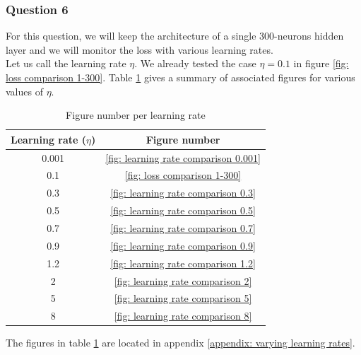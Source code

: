 \documentclass[12pt]{article}
\begin{document}
\subsubsection{Question 6}
For this question, we will keep the architecture of a single 300-neurons hidden layer and we will monitor the loss with various learning rates. \\
Let us call the learning rate $\eta$. We already tested the case $\eta = 0.1$ in figure \ref{fig: loss comparison 1-300}.
Table \ref{table: figures per learning rate} gives a summary of associated figures for various values of $\eta$.
\begin{table}[h]
  \centering
  \begin{tabular}{c|c}
    Learning rate ($\eta$) & Figure number                             \\ \hline
    0.001                  & \ref{fig: learning rate comparison 0.001} \\
    0.1                    & \ref{fig: loss comparison 1-300}          \\
    0.3                    & \ref{fig: learning rate comparison 0.3}   \\
    0.5                    & \ref{fig: learning rate comparison 0.5}   \\
    0.7                    & \ref{fig: learning rate comparison 0.7}   \\
    0.9                    & \ref{fig: learning rate comparison 0.9}   \\
    1.2                    & \ref{fig: learning rate comparison 1.2}   \\
    2                      & \ref{fig: learning rate comparison 2}     \\
    5                      & \ref{fig: learning rate comparison 5}     \\
    8                      & \ref{fig: learning rate comparison 8}     \\
  \end{tabular}
  \caption{Figure number per learning rate}
  \label{table: figures per learning rate}
\end{table}
The figures in table \ref{table: figures per learning rate} are located in appendix \ref{appendix: varying learning rates}.
\end{document}
